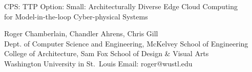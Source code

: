 \documentclass[final,11pt]{article}
\begin{document}
\thispagestyle{empty}
\setcounter{page}{0}

\begin{center}
{\Large CPS: TTP Option: Small: Architecturally Diverse Edge Cloud Computing\\
 for Model-in-the-loop Cyber-physical Systems}

\vskip 0.2in
{\sc Roger Chamberlain, Chandler Ahrens, Chris Gill}
\\Dept. of Computer Science and Engineering, McKelvey School of Engineering\\
College of Architecture, Sam Fox School of Design \& Visual Arts
\\Washington University in St.~Louis
\vskip 0.05in
Email: roger@wustl.edu
\end{center}

\clearpage
\pagestyle{plain}
\setcounter{page}{1}

%
%
%
%
%
%
%

%

\clearpage


\end{document}
